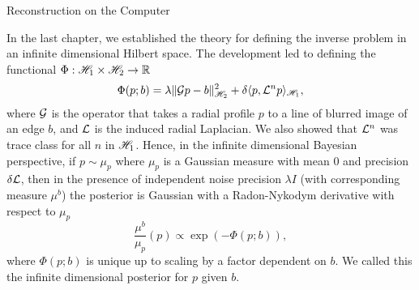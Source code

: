 \setlength{\parindent}{2ex}
\newcommand{\Ab}{{\bf A}}
\newcommand{\N}{\mathcal{N}}
\begin{chapter}{Reconstruction on the Computer}\label{chapter:computational}

In the last chapter, we established the theory for defining the inverse problem in an infinite dimensional Hilbert space. 
The development led to defining the functional $\Phi:\mathscr H_1 \times \mathscr H_2 \to \mathbb R$
\begin{equation} \label{eq:regularizingFunctional}
  \Phi(p; b) = \lambda\|\mathcal G p - b\|_{\mathscr H_2}^2 + \delta\langle p, \mathcal L^n p\rangle_{\mathscr H_1},
\end{equation}
where $\mathcal G$ is the operator that takes a radial profile $p$ to a line of blurred image of an edge $b$, and $\mathcal L$ is the induced radial Laplacian. 
We also showed that $\mathcal L^n$ was trace class for all $n$ in $\mathscr H_1$. %
Hence, in the infinite dimensional Bayesian perspective, if $p\sim \mu_p$ where $\mu_p$ is a Gaussian measure with mean $0$ and precision $\delta \mathcal L$, then in the presence of independent noise precision $\lambda I$ (with corresponding measure $\mu^b$) the posterior is Gaussian with a Radon-Nykodym derivative with respect to $\mu_p$
\begin{equation} \label{eq:posteriorInfinite}
  \frac{\mu^b}{\mu_p}(p) \propto \exp\left(-\Phi(p;b)\right),
\end{equation}
where $\Phi(p;b)$ is unique up to scaling by a factor dependent on $b$.
We called this the infinite dimensional posterior for $p$ given $b$.


\end{chapter}
